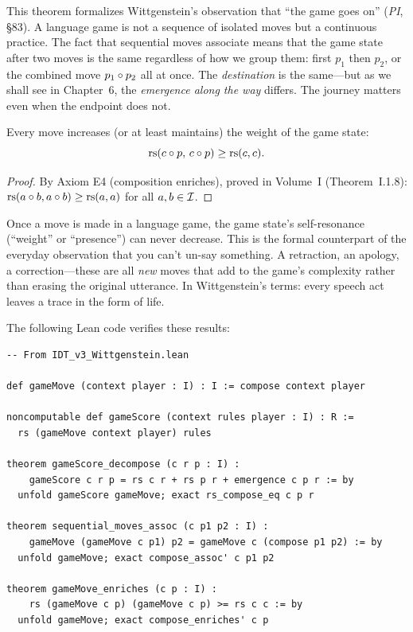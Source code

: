 \begin{interpretation}
This theorem formalizes Wittgenstein's observation that ``the game goes on''
(\textit{PI}, \S83). A language game is not a sequence of isolated moves but a
continuous practice. The fact that sequential moves associate means that the
game state after two moves is the same regardless of how we group them: first
$p_1$ then $p_2$, or the combined move $p_1 \circ p_2$ all at once. The
\emph{destination} is the same---but as we shall see in Chapter~6, the
\emph{emergence along the way} differs. The journey matters even when the
endpoint does not.
\end{interpretation}

\begin{theorem}
\label{thm:moves-enrich}
Every move increases (or at least maintains) the weight of the game state:
\[
\mathrm{rs}(c \circ p,\, c \circ p) \geq \mathrm{rs}(c, c).
\]
\end{theorem}

\begin{proof}
By Axiom E4 (composition enriches), proved in Volume~I (Theorem~I.1.8):
$\mathrm{rs}(a \circ b, a \circ b) \geq \mathrm{rs}(a, a)$ for all $a, b \in \mathcal{I}$.
\end{proof}

\begin{interpretation}
\label{interp:cant-unsay}
Once a move is made in a language game, the game state's self-resonance
(``weight'' or ``presence'') can never decrease. This is the formal
counterpart of the everyday observation that you can't un-say something.
A retraction, an apology, a correction---these are all \emph{new} moves
that add to the game's complexity rather than erasing the original utterance.
In Wittgenstein's terms: every speech act leaves a trace in the form of life.
\end{interpretation}

The following Lean code verifies these results:

\begin{lstlisting}
-- From IDT_v3_Wittgenstein.lean

def gameMove (context player : I) : I := compose context player

noncomputable def gameScore (context rules player : I) : R :=
  rs (gameMove context player) rules

theorem gameScore_decompose (c r p : I) :
    gameScore c r p = rs c r + rs p r + emergence c p r := by
  unfold gameScore gameMove; exact rs_compose_eq c p r

theorem sequential_moves_assoc (c p1 p2 : I) :
    gameMove (gameMove c p1) p2 = gameMove c (compose p1 p2) := by
  unfold gameMove; exact compose_assoc' c p1 p2

theorem gameMove_enriches (c p : I) :
    rs (gameMove c p) (gameMove c p) >= rs c c := by
  unfold gameMove; exact compose_enriches' c p
\end{lstlisting}

